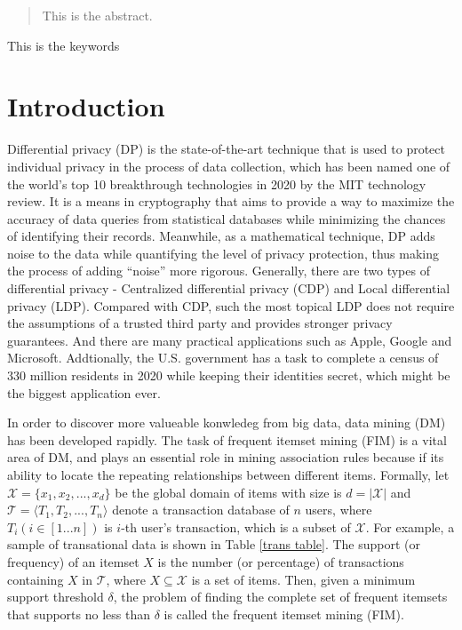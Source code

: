 \documentclass[conference]{IEEEtran}
\begin{document}
\begin{abstract}
This is the abstract.
\end{abstract}

\begin{IEEEkeywords}
This is the keywords
\end{IEEEkeywords}

\section{Introduction}
Differential privacy (DP)\cite{a7} is the state-of-the-art technique that is used to protect individual privacy in the process of data collection, which has been named one of the world's top 10 breakthrough technologies in 2020 by the MIT technology review\cite{MITreview}. It is a means in cryptography that aims to provide a way to maximize the accuracy of data queries from statistical databases while minimizing the chances of identifying their records. Meanwhile, as a mathematical technique, DP adds noise to the data while quantifying the level of privacy protection, thus making the process of adding ``noise'' more rigorous. Generally, there are two types of differential privacy - Centralized differential privacy (CDP) and Local differential privacy (LDP). Compared with CDP, such the most topical LDP does not require the assumptions of a trusted third party and provides stronger privacy guarantees. And there are many practical applications such as Apple\cite{apple,apple new words}, Google\cite{rappor} and Microsoft\cite{microsoft}. Addtionally, the U.S. government has a task to complete a census of 330 million residents in 2020 while keeping their identities secret, which might be the biggest application ever.

In order to discover more valueable konwledeg from big data, data mining (DM) has been developed rapidly. The task of frequent itemset mining (FIM) is a vital area of DM, and plays an essential role in mining association rules because if its ability to locate the repeating relationships between different items\cite{apriori,apr}. Formally, let $\mathcal{X} = \{x_1,x_2,...,x_d\}$ be the global domain of items with size is $d = |\mathcal{X}|$ and $\mathcal{T} = \langle T_1,T_2,...,T_n \rangle$ denote a transaction database of $n$ users, where $T_i(i \in [1...n])$ is $i$-th user's transaction, which is a subset of $\mathcal{X}$. For example, a sample of transational data is shown in Table \ref{trans table}. The support (or frequency) of an itemset $X$ is the number (or percentage) of transactions containing $X$ in $\mathcal{T}$, where $X \subseteq \mathcal{X}$ is a set of items. Then, given a minimum support threshold $\delta$, the problem of finding the complete set of frequent itemsets that supports no less than $\delta$ is called the frequent itemset mining (FIM).
\end{document}
